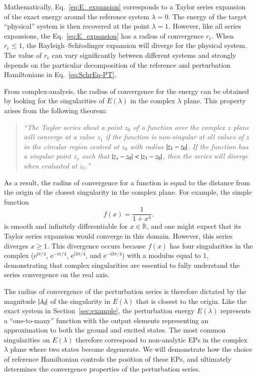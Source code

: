 \documentclass[aps,prb,reprint,noshowkeys,superscriptaddress]{revtex4-1}
\renewcommand{\i}{\mathrm{i}} %
\newcommand{\e}{\mathrm{e}} %
\newcommand{\rc}{r_{\text{c}}}
\begin{document}
Mathematically, Eq.~\eqref{eq:E_expansion} corresponds to a Taylor series expansion of the exact energy
around the reference system $\lambda = 0$.
The energy of the target ``physical'' system is then recovered at the point $\lambda = 1$.
However, like all series expansions, the Eq.~\eqref{eq:E_expansion} has a radius of convergence $\rc$. 
When $\rc \le 1$, the Rayleigh--Sch\"{r}odinger expansion will diverge
for the physical system.
The value of $\rc$ can vary significantly between different systems and strongly depends on the particular decomposition
of the reference and perturbation Hamiltonians in Eq.~\eqref{eq:SchrEq-PT}.\cite{Mihalka_2017b}

From complex-analysis, the radius of convergence for the energy can be obtained by looking for the 
singularities of $E(\lambda)$ in the complex $\lambda$ plane.
This property arises from the following theorem: \cite{Goodson_2012}
\begin{quote}
\it
``The Taylor series about a point $z_0$ of a function over the complex $z$ plane will converge at a value $z_1$ 
if the function is non-singular at all values of $z$ in the circular region centred at $z_0$ with radius $\abs{z_1-z_0}$. 
If the function has a singular point $z_s$ such that $\abs{z_s-z_0} < \abs{z_1-z_0}$, 
then the series will diverge when evaluated at $z_1$.''
\end{quote}
As a result, the radius of convergence for a function is equal to the distance from the origin of the closest singularity
in the complex plane.
For example, the simple function \cite{BenderBook}
\begin{equation} \label{eq:DivExample}
	f(x)=\frac{1}{1+x^4}.
\end{equation}
is smooth and infinitely differentiable for $x \in \mathbb{R}$, and one might expect that its Taylor series expansion would 
converge in this domain.
However, this series diverges $x \ge 1$.
This divergence occurs because $f(x)$ has four singularities in the complex 
($\e^{\i\pi/4}$, $\e^{-\i\pi/4}$, $\e^{\i3\pi/4}$, and $\e^{-\i3\pi/4}$) with a modulus equal to $1$, demonstrating
that complex singularities are essential to fully understand the series convergence on the real axis.

The radius of convergence of the perturbation series is therefore dictated by the magnitude $\abs{\lambda_0}$ of the
singularity in $E(\lambda)$ that is closest to the origin.
Like the exact system in Section~\ref{sec:example}, the perturbation energy $E(\lambda)$ represents
a ``one-to-many'' function with the output elements representing an approximation to both the ground and excited states.
The most common singularities on $E(\lambda)$ therefore correspond to non-analytic EPs in the complex 
$\lambda$ plane where two states become degenerate.
We will demonstrate how the choice of reference Hamiltonian controls the position of these EPs, and 
ultimately determines the convergence properties of the perturbation series.
\end{document}
